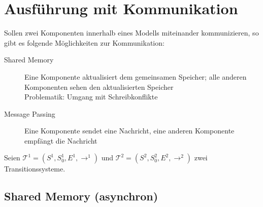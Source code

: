 														\section{Ausführung mit Kommunikation}
															Sollen zwei Komponenten innerhalb eines Modells miteinander kommunizieren, so gibt es folgende Möglichkeiten zur Kommunikation:
															\begin{description}
																\item[Shared Memory] Eine Komponente aktualisiert dem gemeinsamen Speicher; alle anderen Komponenten sehen den aktualisierten Speicher \\
																	Problematik: Umgang mit Schreibkonflikte
																\item[Message Passing] Eine Komponente sendet eine Nachricht, eine anderen Komponente empfängt die Nachricht
															\end{description}

															Seien $ \mathcal{T} ^ 1 = (S ^ 1, S _ 0 ^ 1, E ^ 1, \rightarrow ^ 1) $ und $ \mathcal{T} ^ 2 = (S ^ 2, S _ 0 ^ 2, E ^ 2, \rightarrow ^ 2) $ zwei Transitionssysteme.

															\subsection{Shared Memory (asynchron)}

